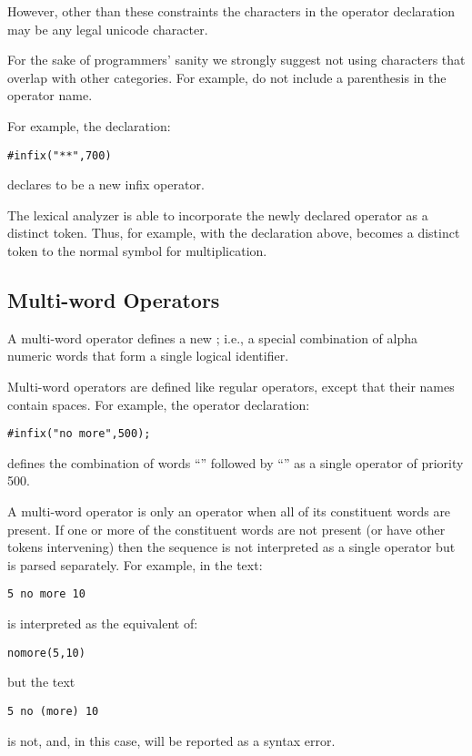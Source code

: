 However, other than these constraints the characters in the operator declaration may be any legal unicode character.
\begin{aside}
For the sake of programmers' sanity we strongly suggest not using characters that overlap with other categories. For example, do not include a parenthesis in the operator name.
\end{aside}

For example, the declaration:
\begin{lstlisting}
#infix("**",700)
\end{lstlisting}
declares \q{**} to be a new infix operator.

The lexical analyzer is able to incorporate the newly declared operator as a distinct token. Thus, for example, with the \q{**} declaration above, \q{**} becomes a distinct token to the normal symbol for multiplication.

\subsection{Multi-word Operators}
\label{multiWordOperators}
A multi-word operator defines a new ; i.e., a special combination of alpha numeric words that form a single logical identifier.

Multi-word operators are defined like regular operators, except that their names contain spaces. For example, the operator declaration:
\begin{lstlisting}
#infix("no more",500);
\end{lstlisting}
defines the combination of words ``'' followed by ``'' as a single operator of priority 500.

A multi-word operator is only an operator when all of its constituent words are present. If one or more of the constituent words are not present (or have other tokens intervening) then the sequence is not interpreted as a single operator but is parsed separately. For example, in the text:
\begin{lstlisting}
5 no more 10
\end{lstlisting}
is interpreted as the equivalent of:
\begin{alltt}
no\spce{}more(5,10)
\end{alltt}
but the text
\begin{lstlisting}
5 no (more) 10
\end{lstlisting}
is not, and, in this case, will be reported as a syntax error. 

